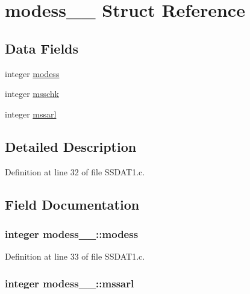 \hypertarget{structmodess__1__}{}\section{modess\+\_\+\_\+ Struct Reference}
\label{structmodess__1__}
\subsection*{Data Fields}
\begin{DoxyCompactItemize}
\item 
integer \hyperlink{structmodess__1___ab4cb7cbd5d4ce74f3e32cec1021d3fa8}{modess}
\item 
integer \hyperlink{structmodess__1___a8657ec388a0cdc37d25944e1e89df035}{msschk}
\item 
integer \hyperlink{structmodess__1___af5a8ca9cd9e7d417ea152a711703ec9a}{mssarl}
\end{DoxyCompactItemize}


\subsection{Detailed Description}


Definition at line 32 of file S\+S\+D\+A\+T1.\+c.



\subsection{Field Documentation}
\subsubsection[{\texorpdfstring{modess}{modess}}]{\setlength{\rightskip}{0pt plus 5cm}integer modess\+\_\+\_\+\+::modess}\hypertarget{structmodess__1___ab4cb7cbd5d4ce74f3e32cec1021d3fa8}{}\label{structmodess__1___ab4cb7cbd5d4ce74f3e32cec1021d3fa8}


Definition at line 33 of file S\+S\+D\+A\+T1.\+c.

\subsubsection[{\texorpdfstring{mssarl}{mssarl}}]{\setlength{\rightskip}{0pt plus 5cm}integer modess\+\_\+\_\+\+::mssarl}\hypertarget{structmodess__1___af5a8ca9cd9e7d417ea152a711703ec9a}{}\label{structmodess__1___af5a8ca9cd9e7d417ea152a711703ec9a}


